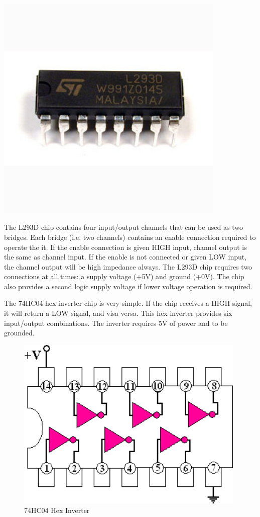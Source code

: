   \begin{center}
    \includegraphics[width=110mm]{imageSources/hBridge.png}
  \label{hBridge}
\end{center}


The L293D chip contains four input/output channels that can be used as two bridges. Each bridge (i.e. two channels) contains an enable connection required to operate the it. If the enable connection is given HIGH input, channel output is the same as channel input. If the enable is not connected or given LOW input, the channel output will be high impedance always. The L293D chip requires two connections at all times: a supply voltage (+5V) and ground (+0V). The chip also provides a second logic supply voltage if lower voltage operation is required.

The 74HC04 hex inverter chip is very simple. If the chip receives a HIGH signal, it will return a LOW signal, and visa versa. This hex inverter provides six input/output combinations. The inverter requires 5V of power and to be grounded.

\begin{figure}[h]
  \begin{center}
    \includegraphics[width=110mm]{imageSources/hexInverter.png}
  \end{center}
  \caption{74HC04 Hex Inverter} 
  \label{hexInverter}
\end{figure}

